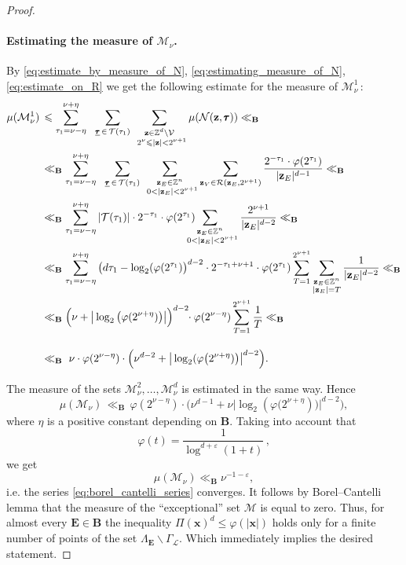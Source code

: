 \documentclass[a4paper,12pt]{article}
\theoremstyle{definition}
\theoremstyle{remark}
\theoremstyle{plain}
\renewcommand{\vec}[1]{\mathbf{#1}}
\renewcommand{\leq}{\leqslant}
\newcommand{\e}{\varepsilon}
\newcommand{\Z}{\mathbb{Z}}
\newcommand{\La}{\Lambda}
\newcommand{\Ga}{\Gamma}
\newcommand{\cL}{\mathcal{L}}
\newcommand{\cM}{\mathcal{M}}
\newcommand{\cN}{\mathcal{N}}
\newcommand{\cR}{\mathcal{R}}
\newcommand{\cT}{\mathcal{T}}
\newcommand{\cV}{\mathcal{V}}
\newcommand{\bB}{\mathbf{B}}
\newcommand{\bE}{\mathbf{E}}
\begin{document}
\begin{proof}
  \paragraph{Estimating the measure of $\cM_\nu$.}
  
  By \eqref{eq:estimate_by_measure_of_N}, \eqref{eq:estimating_measure_of_N}, \eqref{eq:estimate_on_R} we get the following estimate for the measure of $\cM^1_\nu$\,:
  \begin{align*}
    \mu(\cM^1_\nu)\, & \leq
    \sum_{\tau_1=\nu-\eta}^{\nu+\eta}\phantom{1}
    \sum_{\underline{\pmb\tau}\,\in\,\cT(\tau_1)}
    \sum_{\substack{\vec z\in\Z^d\backslash\cV \\ 
                    \,\ 2^\nu\leq|\vec z|<2^{\nu+1}}}
    \mu(\cN(\vec z,\pmb\tau))
    \ll_\bB \\ & \ll_\bB
    \sum_{\tau_1=\nu-\eta}^{\nu+\eta}\phantom{1}
    \sum_{\underline{\pmb\tau}\,\in\,\cT(\tau_1)}
    \sum_{\substack{\vec z_E\in\Z^n \\ 
                    \,\ 0<|\vec z_E|<2^{\nu+1}}}
    \sum_{\vec z_V\in\cR(\vec z_E,2^{\nu+1})}
    \frac{2^{-\tau_1}\cdot\varphi(2^{\tau_1})}{|\vec z_E|^{d-1}}
    \ll_\bB \\ & \ll_\bB
    \sum_{\tau_1=\nu-\eta}^{\nu+\eta}
    |\cT(\tau_1)|\cdot2^{-\tau_1}\cdot\varphi(2^{\tau_1})
    \hskip-5mm
    \sum_{\substack{\vec z_E\in\Z^n \\ 
                    \,\ 0<|\vec z_E|<2^{\nu+1}}}
    \frac{2^{\nu+1}}{|\vec z_E|^{d-2}}
    \ll_\bB \\ & \ll_\bB
    \sum_{\tau_1=\nu-\eta}^{\nu+\eta}
    \big(d\tau_1-\log_2(\varphi(2^{\tau_1})\big)^{d-2}\cdot2^{-\tau_1+\nu+1}\cdot\varphi(2^{\tau_1})
    \sum_{T=1}^{2^{\nu+1}}
    \sum_{\substack{\vec z_E\in\Z^n \\ 
                    |\vec z_E|=T}}
    \frac1{|\vec z_E|^{d-2}}
    \ll_\bB \\ & \ll_\bB
    \Big(\nu+\big|\log_2\big(\varphi(2^{\nu+\eta})\big)\big|\Big)^{d-2}\hskip-1mm\cdot\varphi(2^{\nu-\eta})
    \sum_{T=1}^{2^{\nu+1}}\frac1T
    \ll_\bB \\ & \ll_\bB
    \ \nu\cdot\varphi(2^{\nu-\eta})\cdot\Big(\nu^{d-2}+\big|\log_2(\varphi\big(2^{\nu+\eta})\big)\big|^{d-2}\Big).
    \vphantom{\frac{\Big|}{}}
  \end{align*}
  
  The measure of the sets $\cM^2_\nu,\ldots,\cM^d_\nu$ is estimated in the same way. Hence
  \[
    \mu(\cM_\nu)\,\ll_\bB\,
    \varphi(2^{\nu-\eta})\cdot\Big(\nu^{d-1}+\nu\big|\log_2(\varphi\big(2^{\nu+\eta})\big)\big|^{d-2}\Big),
  \]
  where $\eta$ is a positive constant depending on $\bB$. Taking into account that
  \[
    \varphi(t)=\frac1{\log^{d+\e}(1+t)}\,,
  \]
  we get
  \[
    \mu(\cM_\nu)\ll_\bB\nu^{-1-\e},
  \]
  i.e. the series \eqref{eq:borel_cantelli_series} converges. It follows by Borel--Cantelli lemma that the measure of the ``exceptional'' set $\cM$ is equal to zero. Thus, for almost every $\bE\in\bB$ the inequality $\Pi(\vec x)^d\leq\varphi(|\vec x|)$ holds only for a finite number of points of the set $\La_\bE\backslash\Ga_\cL$. Which immediately implies the desired statement.
\end{proof}
\end{document}
